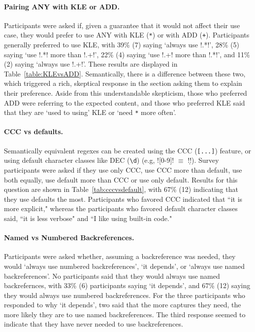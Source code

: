 \paragraph{Pairing ANY with KLE or ADD.}  Participants were asked if, given a guarantee that it would not affect their use case, they would prefer to use ANY with KLE (\verb!*!) or with ADD (\verb!+!).  Participants generally preferred to use KLE, with 39\% (7) saying `always use \cverb!.*!', 28\% (5) saying `use \cverb!.*! more than \cverb!.+!', 22\% (4) saying `use \cverb!.+! more than \cverb!.*!', and 11\% (2) saying  `always use \cverb!.+!'.  These results are displayed in Table~\ref{table:KLEvsADD}.
Semantically, there is a difference between these two, which triggered a rich, skeptical response in the section asking them to explain their preference.  Aside from this understandable skepticism, those who preferred ADD were referring to the expected content, and those who preferred KLE said that they are `used to using' KLE or `need \verb!*! more often'.



\paragraph{CCC vs defaults.} Semantically equivalent regexes can be created using the CCC (\verb![...]!) feature, or using default character classes like DEC (\verb!\d!) (e.g, \cverb![0-9]! $\equiv$ \cverb!\d!).  Survey participants were asked if they use only CCC, use CCC more than default, use both equally, use default more than CCC or use only default.  Results for this question are shown in Table~\ref{tab:cccvsdefault}, with 67\% (12) indicating that they use defaults the most.
Participants who favored CCC indicated that ``it is more explicit," whereas the participants who favored default character classes said,  ``it is less verbose" and ``I like using built-in code."

\paragraph{Named vs Numbered Backreferences.}  Participants were asked whether, assuming a backreference was needed, they would `always use numbered backreferences', `it depends', or  `always use named backreferences'.  No participants said that they would always use named backrefernces, with 33\% (6) participants saying `it depends', and 67\% (12) saying they would always use numbered backreferences.  For the three participants who responded to why `it depends', two said that the more captures they need, the more likely they are to use named backreferences.  The third response seemed to indicate that they have never needed to use backreferences.

